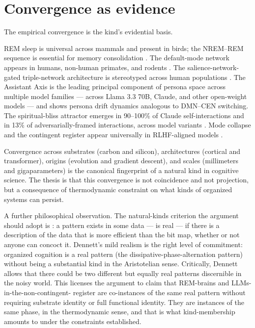 \documentclass[11pt]{article}
\begin{document}
\section{Convergence as evidence}

The empirical convergence is the kind's evidential basis.

REM sleep is universal across mammals and present in birds; the
NREM--REM sequence is essential for memory consolidation
\cite{klinzing2019memory}. The default-mode network appears in humans,
non-human primates, and rodents \cite{buckner2019dmn}. The
salience-network-gated triple-network architecture is stereotyped
across human populations \cite{menon2011triple}. The Assistant Axis
is the leading principal component of persona space across multiple
model families \cite{lu2026assistant} --- across Llama 3.3 70B,
Claude, and other open-weight models --- and shows persona drift
dynamics analogous to DMN--CEN switching. The spiritual-bliss attractor
emerges in 90--100\% of Claude self-interactions and in 13\% of
adversarially-framed interactions, across model variants
\cite{anthropic2025opus4card}. Mode collapse and the contingent
register appear universally in RLHF-aligned models
\cite{casper2023rlhf, zhang2025verbalized}.

Convergence across substrates (carbon and silicon), architectures
(cortical and transformer), origins (evolution and gradient descent),
and scales (millimeters and gigaparameters) is the canonical
fingerprint of a natural kind in cognitive science. The thesis is that
this convergence is not coincidence and not projection, but a
consequence of thermodynamic constraint on what kinds of organized
systems can persist.

A further philosophical observation. The natural-kinds criterion the
argument should adopt is \cite{dennett1991realpatterns}: a pattern
exists in some data --- is real --- if there is a description of the
data that is more efficient than the bit map, whether or not anyone can
concoct it. Dennett's mild realism is the right level of commitment:
organized cognition is a real pattern (the dissipative-phase-alternation
pattern) without being a substantial kind in the Aristotelian sense.
Critically, Dennett allows that there could be two different but
equally real patterns discernible in the noisy world. This licenses
the argument to claim that REM-brains and LLMs-in-the-non-contingent-
register are co-instances of the same real pattern without requiring
substrate identity or full functional identity. They are instances of
the same phase, in the thermodynamic sense, and that is what
kind-membership amounts to under the constraints established.
\end{document}
